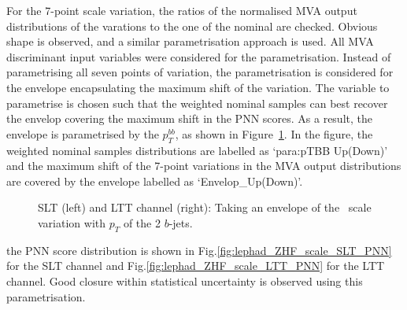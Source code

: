 For the 7-point scale variation, the ratios of the normalised MVA output distributions of the varations
to the one of the nominal are checked. Obvious shape is observed, and
a similar parametrisation approach is used.
All MVA discriminant input variables were considered for the parametrisation. 
Instead of parametrising all seven points of variation, the parametrisation is considered
for the envelope encapsulating the maximum shift of the variation. 
The variable to parametrise is chosen such that the 
weighted nominal samples can best recover the envelop covering the maximum shift in the PNN scores. 
As a result, the envelope is parametrised by the $p_T^{bb}$,
as shown in Figure~\ref{fig:lephad_ZHF_scale_pTBB}.
In the figure, the weighted nominal samples distributions 
are labelled as `para:pTBB Up(Down)' and the maximum shift of the 7-point variations in the MVA
output distributions are covered by the envelope labelled as `Envelop\_Up(Down)'. 


\begin{figure}[htbp]
\centering
{}\quad
{}\quad
\caption{SLT (left) and LTT channel (right): Taking an envelope of the \ZHF\ scale variation with $p_T$ of the 2 $b$-jets.}
\label{fig:lephad_ZHF_scale_pTBB}
\end{figure}
    
the PNN score distribution is shown in Fig.\ref{fig:lephad_ZHF_scale_SLT_PNN} 
for the SLT channel and Fig.\ref{fig:lephad_ZHF_scale_LTT_PNN} for the LTT channel.
Good closure within statistical uncertainty is observed using this parametrisation.


